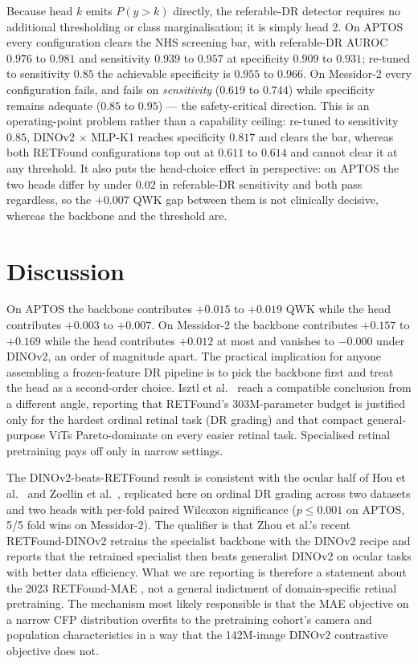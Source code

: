 \documentclass[journal]{IEEEtran}
\begin{document}
Because head $k$ emits $P(y{>}k)$ directly, the referable-DR detector requires no additional thresholding or class marginalisation; it is simply head 2. On APTOS every configuration clears the NHS screening bar, with referable-DR AUROC $0.976$ to $0.981$ and sensitivity $0.939$ to $0.957$ at specificity $0.909$ to $0.931$; re-tuned to sensitivity $0.85$ the achievable specificity is $0.955$ to $0.966$. On Messidor-2 every configuration fails, and fails on \emph{sensitivity} ($0.619$ to $0.744$) while specificity remains adequate ($0.85$ to $0.95$) --- the safety-critical direction. This is an operating-point problem rather than a capability ceiling: re-tuned to sensitivity $0.85$, DINOv2 $\times$ MLP-K1 reaches specificity $0.817$ and clears the bar, whereas both RETFound configurations top out at $0.611$ to $0.614$ and cannot clear it at any threshold. It also puts the head-choice effect in perspective: on APTOS the two heads differ by under $0.02$ in referable-DR sensitivity and both pass regardless, so the $+0.007$ QWK gap between them is not clinically decisive, whereas the backbone and the threshold are.

\section{Discussion}
\label{sec:discussion}

On APTOS the backbone contributes $+0.015$ to $+0.019$ QWK while the head contributes $+0.003$ to $+0.007$. On Messidor-2 the backbone contributes $+0.157$ to $+0.169$ while the head contributes $+0.012$ at most and vanishes to $-0.000$ under DINOv2, an order of magnitude apart. The practical implication for anyone assembling a frozen-feature DR pipeline is to pick the backbone first and treat the head as a second-order choice. Isztl et al.\ \cite{ref:zoellin} reach a compatible conclusion from a different angle, reporting that RETFound's 303M-parameter budget is justified only for the hardest ordinal retinal task (DR grading) and that compact general-purpose ViTs Pareto-dominate on every easier retinal task. Specialised retinal pretraining pays off only in narrow settings.

The DINOv2-beats-RETFound result is consistent with the ocular half of Hou et al.\ \cite{ref:dinov2_vs_retfound} and Zoellin et al.\ \cite{ref:zoellin}, replicated here on ordinal DR grading across two datasets and two heads with per-fold paired Wilcoxon significance ($p \leq 0.001$ on APTOS, 5/5 fold wins on Messidor-2). The qualifier is that Zhou et al.'s recent RETFound-DINOv2 \cite{ref:zoellin} retrains the specialist backbone with the DINOv2 recipe and reports that the retrained specialist then beats generalist DINOv2 on ocular tasks with better data efficiency. What we are reporting is therefore a statement about the 2023 RETFound-MAE \cite{ref:retfound}, not a general indictment of domain-specific retinal pretraining. The mechanism most likely responsible is that the MAE objective on a narrow CFP distribution overfits to the pretraining cohort's camera and population characteristics in a way that the 142M-image DINOv2 contrastive objective does not.
\end{document}
